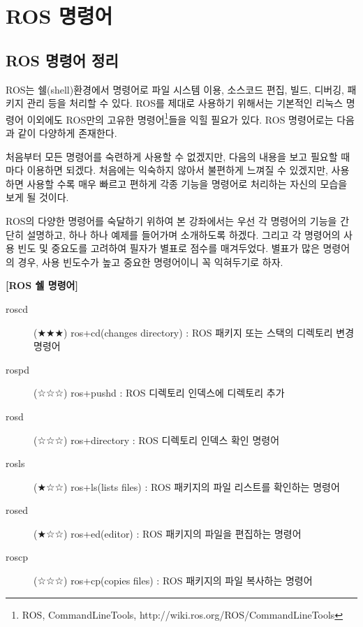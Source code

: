 

\chapter{ROS 명령어}

\section{ROS 명령어 정리}
\label{sec:RosCommand}

ROS는 쉘(shell)환경에서 명령어로 파일 시스템 이용, 소스코드 편집, 빌드, 디버깅, 패키지 관리 등을 처리할 수 있다. ROS를 제대로 사용하기 위해서는 기본적인 리눅스 명령어 이외에도 ROS만의 고유한 명령어\footnote{ROS, CommandLineTools, http://wiki.ros.org/ROS/CommandLineTools}들을 익힐 필요가 있다. ROS 명령어로는 다음과 같이 다양하게 존재한다. 

처음부터 모든 명령어를 숙련하게 사용할 수 없겠지만, 다음의 내용을 보고 필요할 때마다 이용하면 되겠다. 처음에는 익숙하지 않아서 불편하게 느껴질 수 있겠지만, 사용하면 사용할 수록 매우 빠르고 편하게 각종 기능을 명령어로 처리하는 자신의 모습을 보게 될 것이다.

ROS의 다양한 명령어를 숙달하기 위하여 본 강좌에서는 우선 각 명령어의 기능을 간단히 설명하고, 하나 하나 예제를 들어가며 소개하도록 하겠다. 그리고 각 명령어의 사용 빈도 및 중요도를 고려하여 필자가 별표로 점수를 매겨두었다. 별표가 많은 명령어의 경우, 사용 빈도수가 높고 중요한 명령어이니 꼭 익혀두기로 하자.

\vspace{\baselineskip}
\noindent
\textbf{[ROS 쉘 명령어]}
\begin{description}
\item[roscd] (★★★) ros+cd(changes directory) : ROS 패키지 또는 스택의 디렉토리 변경 명령어
\item[rospd] (☆☆☆) ros+pushd : ROS 디렉토리 인덱스에 디렉토리 추가
\item[rosd] (☆☆☆) ros+directory : ROS 디렉토리 인덱스 확인 명령어
\item[rosls] (★☆☆) ros+ls(lists files) : ROS 패키지의 파일 리스트를 확인하는 명령어
\item[rosed] (★☆☆) ros+ed(editor) : ROS 패키지의 파일을 편집하는 명령어
\item[roscp] (☆☆☆) ros+cp(copies files) : ROS 패키지의 파일 복사하는 명령어
\end{description}

